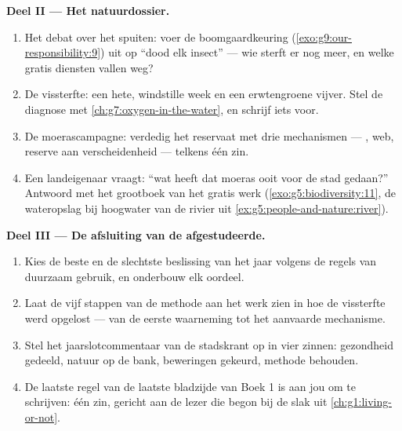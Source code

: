 \begin{problem}
\medskip\noindent\textbf{Deel II --- Het natuurdossier.}
\begin{enumerate}[resume]
  \item Het debat over het spuiten: voer de boomgaardkeuring
        (\cref{exo:g9:our-responsibility:9}) uit op ``dood elk
        insect'' --- wie sterft er nog meer, en welke gratis
        diensten vallen weg?
  \item De vissterfte: een hete, windstille week en een
        erwtengroene vijver. Stel de diagnose met
        \cref{ch:g7:oxygen-in-the-water}, en schrijf iets
        voor.
  \item De moerascampagne: verdedig het reservaat met drie
        mechanismen --- , web, reserve aan
        verscheidenheid --- telkens één zin.
  \item Een landeigenaar vraagt: ``wat heeft dat moeras ooit voor
        de stad gedaan?'' Antwoord met het grootboek van het
        gratis werk (\cref{exo:g5:biodiversity:11}, de
        wateropslag bij hoogwater van de rivier uit
        \cref{ex:g5:people-and-nature:river}).
\end{enumerate}

\medskip\noindent\textbf{Deel III --- De afsluiting van de
afgestudeerde.}
\begin{enumerate}[resume]
  \item Kies de beste en de slechtste beslissing van het jaar
        volgens de regels van duurzaam gebruik, en onderbouw elk
        oordeel.
  \item Laat de vijf stappen van de methode aan het werk zien in
        hoe de vissterfte werd opgelost --- van de eerste
        waarneming tot het aanvaarde mechanisme.
  \item Stel het jaarslotcommentaar van de stadskrant op in vier
        zinnen: gezondheid gedeeld, natuur op de bank, beweringen
        gekeurd, methode behouden.
  \item De laatste regel van de laatste bladzijde van Boek 1 is
        aan jou om te schrijven: één zin, gericht aan de lezer die
        begon bij de slak uit
        \cref{ch:g1:living-or-not}.
\end{enumerate}
\end{problem}
